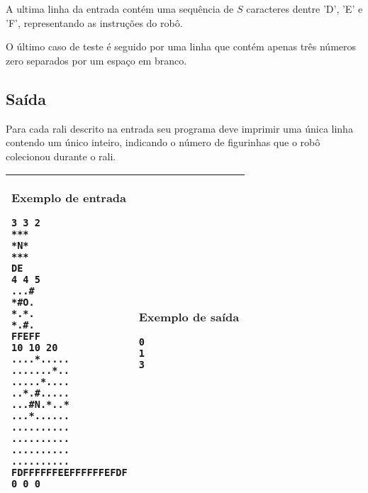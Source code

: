 A ultima linha da entrada contém uma sequência de $S$ caracteres dentre 'D', 'E'
e 'F', representando as instruções do robô.

O último caso de teste é seguido por uma linha que contém apenas três números
zero separados por um espaço em branco.

\subsection*{Saída}

Para cada rali descrito na entrada seu programa deve imprimir uma única linha
contendo um único inteiro, indicando o número de figurinhas que o robô
colecionou durante o rali.

\begin{table}[!h]
\centering
\begin{tabular}{|l|l|}
\hline
\begin{minipage}[t]{3in}
\textbf{Exemplo de entrada}
\begin{verbatim}
3 3 2
***
*N*
***
DE
4 4 5
...#
*#O.
*.*.
*.#.
FFEFF
10 10 20
....*.....
.......*..
.....*....
..*.#.....
...#N.*..*
...*......
..........
..........
..........
..........
FDFFFFFFEEFFFFFFEFDF
0 0 0
\end{verbatim}
\vspace{1mm}
\end{minipage}
&

\begin{minipage}[t]{3in}
\textbf{Exemplo de saída}
\begin{verbatim}
0
1
3
\end{verbatim}
\vspace{1mm}
\end{minipage} \\
\hline
\end{tabular}
\end{table}

\newpage
